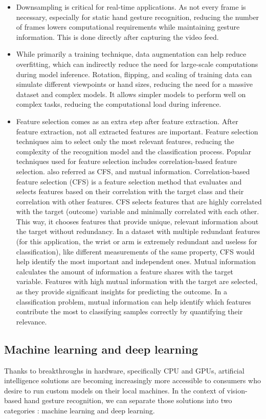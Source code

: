 \documentclass[12pt]{article}
\begin{document}
\begin{itemize}
  \item Downsampling is critical for real-time applications. As not every frame is necessary, especially for static hand gesture recognition, reducing the number of frames lowers computational requirements while maintaining gesture information. This is done directly after capturing the video feed.
  \item While primarily a training technique, data augmentation can help reduce overfitting, which can indirectly reduce the need for large-scale computations during model inference. Rotation, flipping, and scaling of training data can simulate different viewpoints or hand sizes, reducing the need for a massive dataset and complex models. It allows simpler models to perform well on complex tasks, reducing the computational load during inference.
  \item Feature selection comes as an extra step after feature extraction. After feature extraction, not all extracted features are important. Feature selection techniques aim to select only the most relevant features, reducing the complexity of the recognition model and the classification process. Popular techniques used for feature selection includes correlation-based feature selection. also referred as CFS, and mutual information. Correlation-based feature selection (CFS) is a feature selection method that evaluates and selects features based on their correlation with the target class and their correlation with other features. CFS selects features that are highly correlated with the target (outcome) variable and minimally correlated with each other. This way, it chooses features that provide unique, relevant information about the target without redundancy. In a dataset with multiple redundant features (for this application, the wrist or arm is extremely redundant and useless for classification), like different measurements of the same property, CFS would help identify the most important and independent ones. Mutual information calculates the amount of information a feature shares with the target variable. Features with high mutual information with the target are selected, as they provide significant insights for predicting the outcome. In a classification problem, mutual information can help identify which features contribute the most to classifying samples correctly by quantifying their relevance. 
\end{itemize}

\subsection{Machine learning and deep learning}
Thanks to breakthroughs in hardware, specifically CPU and GPUs, artificial intelligence solutions are becoming increasingly more accessible to consumers who desire to run custom models on their local machines. In the context of vision-based hand gesture recognition, we can separate those solutions into two categories : machine learning and deep learning.
\end{document}

